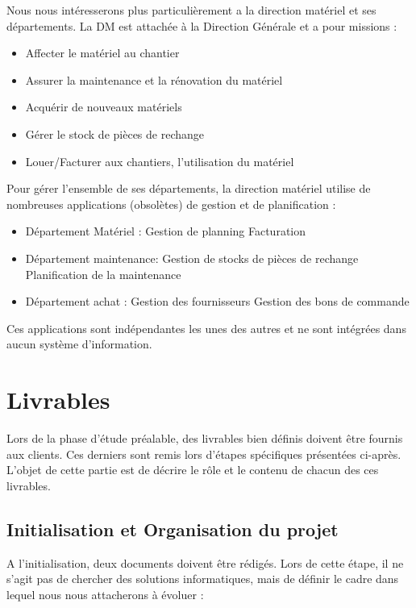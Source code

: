 Nous nous intéresserons plus particulièrement a la direction matériel et ses départements. La DM est attachée à la Direction Générale et a pour missions :
\begin{itemize}
    \item Affecter le matériel au chantier
    \item Assurer la maintenance et la rénovation du matériel
    \item Acquérir de nouveaux matériels
    \item Gérer le stock de pièces de rechange
    \item Louer/Facturer aux chantiers, l’utilisation du matériel
\end{itemize}
Pour gérer l’ensemble de ses départements, la direction matériel utilise de nombreuses applications (obsolètes) de gestion et de planification :
\begin{itemize}
    \item Département Matériel :
        \subitem Gestion de planning
        \subitem Facturation
    \item Département maintenance:
        \subitem Gestion de stocks de pièces de rechange
        \subitem Planification de la maintenance
    \item Département achat :
        \subitem Gestion des fournisseurs
        \subitem Gestion des bons de commande
\end{itemize}


Ces applications sont indépendantes les unes des autres et ne sont intégrées dans aucun système d’information.

\section{Livrables}

Lors de la phase d’étude préalable, des livrables bien définis doivent être fournis aux clients. Ces derniers sont remis lors d’étapes spécifiques présentées ci-après.  L’objet de cette partie est de décrire le rôle et le contenu de chacun des ces livrables.
\subsection{Initialisation et Organisation du projet}

A l’initialisation, deux documents doivent être rédigés. Lors de cette étape, il ne s’agit pas de chercher des solutions informatiques, mais de définir le cadre dans lequel nous nous attacherons à évoluer :

